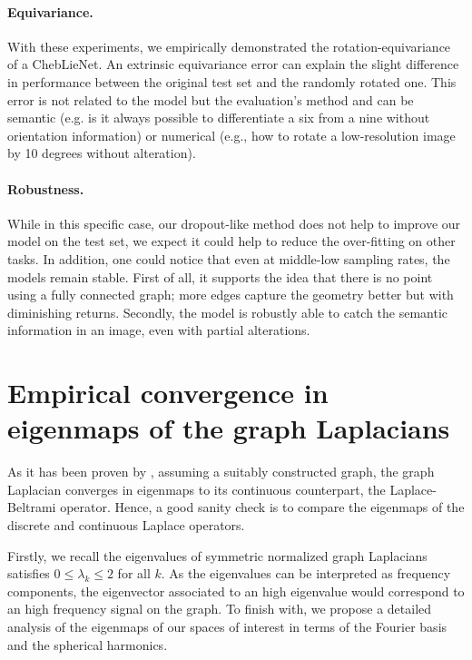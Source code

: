 \documentclass{article}
\begin{document}
\paragraph{Equivariance.} With these experiments, we empirically demonstrated the rotation-equivariance of a ChebLieNet. An extrinsic equivariance error can explain the slight difference in performance between the original test set and the randomly rotated one. This error is not related to the model but the evaluation's method and can be semantic (e.g. is it always possible to differentiate a six from a nine without orientation information) or numerical (e.g., how to rotate a low-resolution image by 10 degrees without alteration). 

\paragraph{Robustness.} While in this specific case, our dropout-like method does not help to improve our model on the test set, we expect it could help to reduce the over-fitting on other tasks. In addition, one could notice that even at middle-low sampling rates, the models remain stable. First of all, it supports the idea that there is no point using a fully connected graph; more edges capture the geometry better but with diminishing returns. Secondly, the model is robustly able to catch the semantic information in an image, even with partial alterations.

\section{Empirical convergence in eigenmaps of the graph Laplacians} \label{app:laplacian}

As it has been proven by \cite{belkin2006convergence}, assuming a suitably constructed graph, the graph Laplacian converges in eigenmaps to its continuous counterpart, the Laplace-Beltrami operator. Hence, a good sanity check is to compare the eigenmaps of the discrete and continuous Laplace operators. 

Firstly, we recall the eigenvalues of symmetric normalized graph Laplacians satisfies $0 \leq \lambda_k \leq 2$ for all $k$. As the eigenvalues can be interpreted as frequency components, the eigenvector associated to an high eigenvalue would correspond to an high frequency signal on the graph. To finish with, we propose a detailed analysis of the eigenmaps of our spaces of interest in terms of the Fourier basis and the spherical harmonics.
\end{document}
